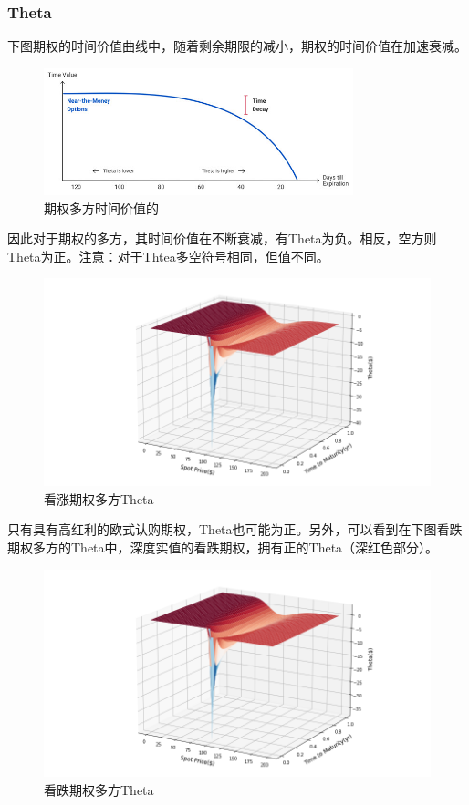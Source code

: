 \documentclass[11pt]{article}
\begin{document}
\subsubsection{Theta}

下图期权的时间价值曲线中，随着剩余期限的减小，期权的时间价值在加速衰减。
\begin{figure}[H]
    \centering
    \includegraphics[width=0.8\textwidth]{fig/time-value.jpeg}
    \caption{期权多方时间价值的}
    \label{fig:time-value}
\end{figure}

因此对于期权的多方，其时间价值在不断衰减，有Theta为负。相反，空方则Theta为正。注意：对于Thtea多空符号相同，但值不同。
\begin{figure}[H]
    \centering
    \includegraphics[width=\textwidth]{fig/theta-call-surf.png}
    \caption{看涨期权多方Theta}
    \label{fig:theta-call-surf}
\end{figure}

只有具有高红利的欧式认购期权，Theta也可能为正。另外，可以看到在下图看跌期权多方的Theta中，深度实值的看跌期权，拥有正的Theta（深红色部分）。
\begin{figure}[H]
    \centering
    \includegraphics[width=\textwidth]{fig/theta-put-surf.png}
    \caption{看跌期权多方Theta}
    \label{fig:theta-put-surf}
\end{figure}
\end{document}

